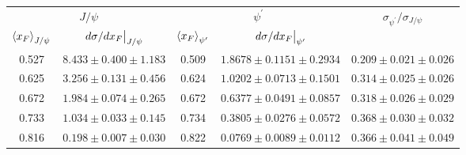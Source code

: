\begin{tabular}{cc|cc|c}
\hline
\multicolumn{2}{c|}{$J/\psi$} &
  \multicolumn{2}{c|}{$\psi^{\prime}$} &
  \multirow{2}{*}{$\sigma_{\psi^\prime}/\sigma_{J/\psi}$} \\ \cline{1-4}
$\expval{x_F}_{J/\psi}$ &
  $\eval{d\sigma/dx_F}_{J/\psi}$ &
  $\expval{x_F}_{\psi^\prime}$ &
  $\eval{d\sigma/dx_F}_{\psi^\prime}$ &
   \\ \hline
\multicolumn{1}{c|}{0.527} &
  $8.433\pm0.400\pm1.183$ &
  \multicolumn{1}{c|}{0.509} &
  $1.8678\pm0.1151\pm0.2934$ &
  $0.209\pm0.021\pm0.026$ \\
\multicolumn{1}{c|}{0.625} &
  $3.256\pm0.131\pm0.456$ &
  \multicolumn{1}{c|}{0.624} &
  $1.0202\pm0.0713\pm0.1501$ &
  $0.314\pm0.025\pm0.026$ \\
\multicolumn{1}{c|}{0.672} &
  $1.984\pm0.074\pm0.265$ &
  \multicolumn{1}{c|}{0.672} &
  $0.6377\pm0.0491\pm0.0857$ &
  $0.318\pm0.026\pm0.029$ \\
\multicolumn{1}{c|}{0.733} &
  $1.034\pm0.033\pm0.145$ &
  \multicolumn{1}{c|}{0.734} &
  $0.3805\pm0.0276\pm0.0572$ &
  $0.368\pm0.030\pm0.032$ \\
\multicolumn{1}{c|}{0.816} &
  $0.198\pm0.007\pm0.030$ &
  \multicolumn{1}{c|}{0.822} &
  $0.0769\pm0.0089\pm0.0112$ &
  $0.366\pm0.041\pm0.049$ \\ \hline
\end{tabular}
